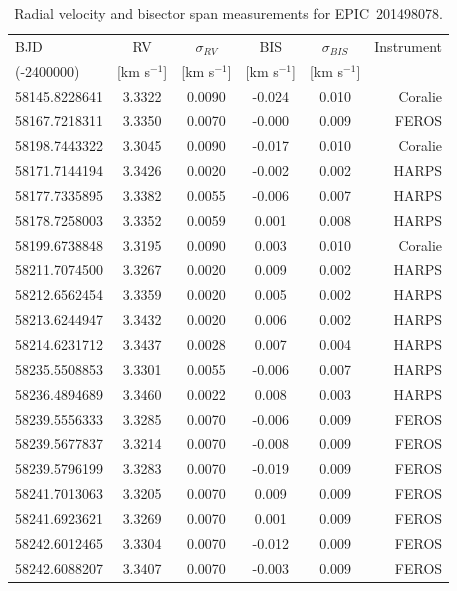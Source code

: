 \documentclass[useAMS,usenatbib]{mnras}
\newcommand{\stname}{EPIC~201498078}
\begin{document}
\appendix
\begin{table}
 \centering
  \caption{Radial velocity and bisector span measurements for \stname.}
  \label{rvsbss}
  \begin{tabular}{@{}lccccr@{}}
  \hline
     BJD              &   RV                  & $\sigma_{RV}$ &   BIS               &  $\sigma_{BIS}$ &  Instrument \\
    (-2400000)     &   [km s$^{-1}$]  & [km s$^{-1}$]   &   [km s$^{-1}$] &   [km s$^{-1}$] &   \\
 \hline

58145.8228641 & 3.3322 & 0.0090 & -0.024 & 0.010 & Coralie \\
58167.7218311 & 3.3350 & 0.0070 & -0.000 & 0.009 & FEROS \\
58198.7443322 & 3.3045 & 0.0090 & -0.017 & 0.010 & Coralie \\	
58171.7144194 & 3.3426 & 0.0020 & -0.002 & 0.002 & HARPS \\
58177.7335895 & 3.3382 & 0.0055 & -0.006 & 0.007 & HARPS \\
58178.7258003 & 3.3352 & 0.0059 &  0.001 & 0.008 & HARPS \\
58199.6738848 & 3.3195 & 0.0090 &  0.003 & 0.010 & Coralie \\
58211.7074500 & 3.3267 & 0.0020 &  0.009 & 0.002 & HARPS \\
58212.6562454 & 3.3359 & 0.0020 &  0.005 & 0.002 & HARPS \\
58213.6244947 & 3.3432 & 0.0020 &  0.006 & 0.002 & HARPS \\
58214.6231712 & 3.3437 & 0.0028 &  0.007 & 0.004 & HARPS \\
58235.5508853 & 3.3301 & 0.0055 & -0.006 & 0.007 & HARPS \\
58236.4894689 & 3.3460 & 0.0022 &  0.008 & 0.003 & HARPS \\
58239.5556333 & 3.3285 & 0.0070 & -0.006 & 0.009 & FEROS \\
58239.5677837 & 3.3214 & 0.0070 & -0.008 & 0.009 & FEROS \\
58239.5796199 & 3.3283 & 0.0070 & -0.019 & 0.009 & FEROS \\
58241.7013063 & 3.3205 & 0.0070 &  0.009 & 0.009 & FEROS \\
58241.6923621 & 3.3269 & 0.0070 &  0.001 & 0.009 & FEROS \\
58242.6012465 & 3.3304 & 0.0070 & -0.012 & 0.009 & FEROS \\
58242.6088207 & 3.3407 & 0.0070 & -0.003 & 0.009 & FEROS \\

\end{tabular}
\end{table}
\end{document}
